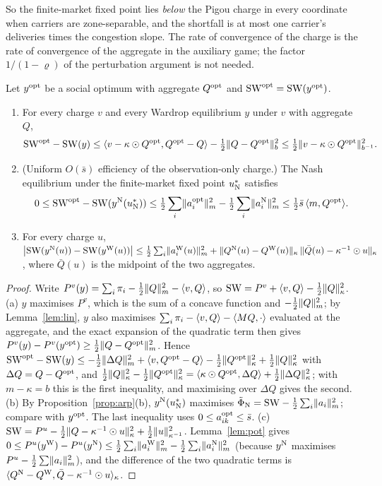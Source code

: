 So the finite-market fixed point lies \emph{below} the Pigou charge in every coordinate when carriers are zone-separable, and the shortfall is at most one carrier's deliveries times the congestion slope. The rate of convergence of the charge is the rate of convergence of the aggregate in the auxiliary game; the factor $1/(1-\varrho)$ of the perturbation argument is not needed.

\begin{theorem}[Welfare]\label{thm:welfare}
Let $y^{\mathrm{opt}}$ be a social optimum with aggregate $Q^{\mathrm{opt}}$ and $\mathrm{SW}^{\mathrm{opt}}=\mathrm{SW}(y^{\mathrm{opt}})$.
\begin{enumerate}
\item[(a)] For every charge $v$ and every Wardrop equilibrium $y$ under $v$ with aggregate $Q$,
\[
\mathrm{SW}^{\mathrm{opt}}-\mathrm{SW}(y)\le\langle v-\kappa\odot Q^{\mathrm{opt}},Q^{\mathrm{opt}}-Q\rangle-\tfrac12\lVert Q-Q^{\mathrm{opt}}\rVert_b^2\le\tfrac12\lVert v-\kappa\odot Q^{\mathrm{opt}}\rVert_{b^{-1}}^2 .
\]
\item[(b)] (Uniform $O(\bar s)$ efficiency of the observation-only charge.) The Nash equilibrium under the finite-market fixed point $u_{\mathrm{N}}^*$ satisfies
\[
0\le\mathrm{SW}^{\mathrm{opt}}-\mathrm{SW}(y^{\mathrm{N}}(u_{\mathrm{N}}^*))\le\tfrac12\sum_i\lVert a_i^{\mathrm{opt}}\rVert_m^2-\tfrac12\sum_i\lVert a_i^{\mathrm{N}}\rVert_m^2\le\tfrac12\bar s\,\langle m,Q^{\mathrm{opt}}\rangle.
\]
\item[(c)] For every charge $u$, $\big|\mathrm{SW}(y^{\mathrm{N}}(u))-\mathrm{SW}(y^{\mathrm{W}}(u))\big|\le\tfrac12\sum_i\lVert a_i^{\mathrm{W}}(u)\rVert_m^2+\lVert Q^{\mathrm{N}}(u)-Q^{\mathrm{W}}(u)\rVert_\kappa\,\lVert \bar Q(u)-\kappa^{-1}\odot u\rVert_\kappa$, where $\bar Q(u)$ is the midpoint of the two aggregates.
\end{enumerate}
\end{theorem}
\begin{proof}
Write $P^v(y)=\sum_i\pi_i-\tfrac12\lVert Q\rVert_m^2-\langle v,Q\rangle$, so $\mathrm{SW}=P^v+\langle v,Q\rangle-\tfrac12\lVert Q\rVert_\kappa^2$. (a) $y$ maximises $P^v$, which is the sum of a concave function and $-\tfrac12\lVert Q\rVert_m^2$; by Lemma~\ref{lem:lin}, $y$ also maximises $\sum_i\pi_i-\langle v,Q\rangle-\langle MQ,\cdot\rangle$ evaluated at the aggregate, and the exact expansion of the quadratic term then gives $P^v(y)-P^v(y^{\mathrm{opt}})\ge\tfrac12\lVert Q-Q^{\mathrm{opt}}\rVert_m^2$. Hence
$\mathrm{SW}^{\mathrm{opt}}-\mathrm{SW}(y)\le-\tfrac12\lVert \Delta Q\rVert_m^2+\langle v,Q^{\mathrm{opt}}-Q\rangle-\tfrac12\lVert Q^{\mathrm{opt}}\rVert_\kappa^2+\tfrac12\lVert Q\rVert_\kappa^2$ with $\Delta Q=Q-Q^{\mathrm{opt}}$, and $\tfrac12\lVert Q\rVert_\kappa^2-\tfrac12\lVert Q^{\mathrm{opt}}\rVert_\kappa^2=\langle \kappa\odot Q^{\mathrm{opt}},\Delta Q\rangle+\tfrac12\lVert \Delta Q\rVert_\kappa^2$; with $m-\kappa=b$ this is the first inequality, and maximising over $\Delta Q$ gives the second.
(b) By Proposition~\ref{prop:arp}(b), $y^{\mathrm{N}}(u_{\mathrm{N}}^*)$ maximises $\tilde\Phi_{\mathrm{N}}=\mathrm{SW}-\tfrac12\sum_i\lVert a_i\rVert_m^2$; compare with $y^{\mathrm{opt}}$. The last inequality uses $0\le a_{ik}^{\mathrm{opt}}\le\bar s$.
(c) $\mathrm{SW}=P^u-\tfrac12\lVert Q-\kappa^{-1}\odot u\rVert_\kappa^2+\tfrac12\lVert u\rVert_{\kappa^{-1}}^2$. Lemma~\ref{lem:pot} gives $0\le P^u(y^{\mathrm{W}})-P^u(y^{\mathrm{N}})\le\tfrac12\sum_i\lVert a_i^{\mathrm{W}}\rVert_m^2-\tfrac12\sum_i\lVert a_i^{\mathrm{N}}\rVert_m^2$ (because $y^{\mathrm{N}}$ maximises $P^u-\tfrac12\sum\lVert a_i\rVert_m^2$), and the difference of the two quadratic terms is $\langle Q^{\mathrm{N}}-Q^{\mathrm{W}},\bar Q-\kappa^{-1}\odot u\rangle_\kappa$.
\end{proof}

